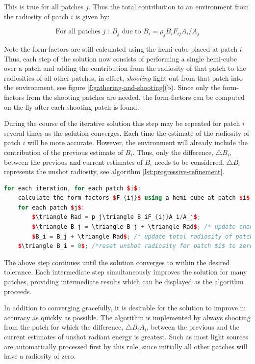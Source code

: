 This is true for all patches $j$. Thus the total contribution to an environment from the radiosity of patch $i$ is given by:

\begin{equation}
	\text{For all patches $j$ : $B_j$ due to $B_i=\rho_jB_iF_{ij}A_i/A_j$}
\end{equation}

Note the form-factors are still calculated using the hemi-cube placed at patch $i$. Thus, each step of the solution now consists of performing a single hemi-cube over a patch and adding the contribution from the radiosity of that patch to the radiosities of all other patches, in effect, \textit{shooting} light out from that patch into the environment, see figure \ref{f:gathering-and-shooting}(b). Since only the form-factors from the shooting patches are needed, the form-factors can be computed on-the-fly after each shooting patch is found.

During the course of the iterative solution this step may be repeated for patch $i$ several times as the solution converges. Each time the estimate of the radiosity of patch $i$ will be more accurate. However, the environment will already include the contribution of the previous estimate of $B_i$. Thus, only the difference, $\triangle B_i$, between the previous and current estimates of $B_i$ needs to be considered. $\triangle B_i$ represents the unshot radiosity, see algorithm \ref{lst:progressive-refinement}.

\begin{lstlisting}[language=C++,mathescape,caption=Progressive refinement radiosity algorithm,label=lst:progressive-refinement]
for each iteration, for each patch $i$:
	calculate the form-factors $F_{ij}$ using a hemi-cube at patch $i$;
	for each patch $j$:
		$\triangle Rad = p_j\triangle B_iF_{ij}A_i/A_j$;
		$\triangle B_j = \triangle B_j + \triangle Rad$; /* update change since last time patch $j$ shot light */
		$B_i = B_j + \triangle Rad$; /* update total radiosity of patch $j$ */
	$\triangle B_i = 0$; /*reset unshot radiosity for patch $i$ to zero*/\end{lstlisting}

The above step continues until the solution converges to within the desired tolerance. Each intermediate step simultaneously improves the solution for many patches, providing intermediate results which can be displayed as the algorithm proceeds.

In addition to converging gracefully, it is desirable for the solution to improve in accuracy as quickly as possible. The algorithm is implemented by always shooting from the patch for which the difference, $\triangle B_iA_i$, between the previous and the current estimates of unshot radiant energy is greatest. Such as most light sources are automatically processed first by this rule, since initially all other patches will have a radiosity of zero.




